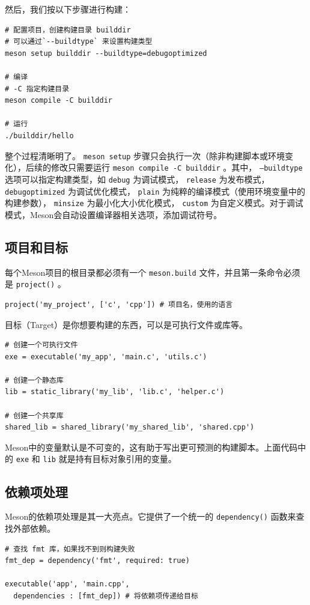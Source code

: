 然后，我们按以下步骤进行构建：
\begin{verbatim}
# 配置项目，创建构建目录 builddir
# 可以通过`--buildtype` 来设置构建类型
meson setup builddir --buildtype=debugoptimized

# 编译
# -C 指定构建目录
meson compile -C builddir

# 运行
./builddir/hello
\end{verbatim}

整个过程清晰明了。 \texttt{meson setup}  步骤只会执行一次（除非构建脚本或环境变化），后续的修改只需要运行 \texttt{meson compile -C builddir} 。其中， \texttt{--buildtype} 选项可以指定构建类型，如 \texttt{debug} 为调试模式， \texttt{release} 为发布模式， \texttt{debugoptimized} 为调试优化模式， \texttt{plain} 为纯粹的编译模式（使用环境变量中的构建参数）， \texttt{minsize} 为最小化大小优化模式， \texttt{custom} 为自定义模式。对于调试模式，Meson会自动设置编译器相关选项，添加调试符号。

\subsection{项目和目标}
每个Meson项目的根目录都必须有一个 \texttt{meson.build} 文件，并且第一条命令必须是 \texttt{project()} 。
\begin{verbatim}
project('my_project', ['c', 'cpp']) # 项目名，使用的语言
\end{verbatim}

目标（Target）是你想要构建的东西，可以是可执行文件或库等。
\begin{verbatim}
# 创建一个可执行文件
exe = executable('my_app', 'main.c', 'utils.c')

# 创建一个静态库
lib = static_library('my_lib', 'lib.c', 'helper.c')

# 创建一个共享库
shared_lib = shared_library('my_shared_lib', 'shared.cpp')
\end{verbatim}

Meson中的变量默认是不可变的，这有助于写出更可预测的构建脚本。上面代码中的 \texttt{exe} 和 \texttt{lib} 就是持有目标对象引用的变量。

\subsection{依赖项处理}
Meson的依赖项处理是其一大亮点。它提供了一个统一的 \texttt{dependency()} 函数来查找外部依赖。
\begin{verbatim}
# 查找 fmt 库，如果找不到则构建失败
fmt_dep = dependency('fmt', required: true)

executable('app', 'main.cpp',
  dependencies : [fmt_dep]) # 将依赖项传递给目标
\end{verbatim}

